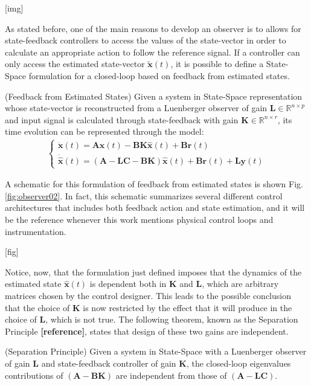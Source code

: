 \documentclass[a4paper,11pt]{book}
\numberwithin{figure}{chapter}
\numberwithin{equation}{chapter}
\numberwithin{table}{chapter}
\newtheorem{theorem}{Theorem}[chapter]
\theoremstyle{definition}
\newtheorem{definition}{Definition}[chapter]
\newcounter{boxed-theorem}
\newenvironment{boxed-theorem}[1]
{\begin{shaded} \begin{theorem}{#1}}
{\end{theorem} \end{shaded}}
\newcounter{boxed-definition}
\newenvironment{boxed-definition}[1]
{\begin{shaded} \begin{definition}{#1}}
{\end{definition} \end{shaded}}
\begin{document}
[img]

As stated before, one of the main reasons to develop an observer is to allows for state-feedback controllers to access the values of the state-vector in order to calculate an appropriate action to follow the reference signal. If a controller can only access the estimated state-vector $\tilde{\bm{x}}(t)$, it is possible to define a State-Space formulation for a closed-loop based on feedback from estimated states.

\begin{boxed-definition}{(Feedback from Estimated States)} \label{def:fdbckLuenberger}
	Given a system in State-Space representation whose state-vector is reconstructed from a Luenberger observer of gain $\bm{L} \in \mathbb{R}^{n \times p}$ and input signal is calculated through state-feedback with gain $\bm{K} \in \mathbb{R}^{n \times r}$, its time evolution can be represented through the model:
	\begin{align} \label{eq:fdbckLuenberger01}
	\begin{cases}
		\dot{\bm{x}}(t) = \bm{A} \bm{x}(t) - \bm{B} \bm{K} \hat{\bm{x}}(t) + \bm{B} \bm{r}(t) \\
		\dot{\hat{\bm{x}}}(t) = \left(\bm{A} - \bm{L} \bm{C} - \bm{B} \bm{K} \right) \hat{\bm{x}}(t) + \bm{B} \bm{r}(t) + \bm{L} \bm{y}(t) 
	\end{cases}
	\end{align}
\end{boxed-definition} 

A schematic for this formulation of feedback from estimated states is shown Fig. \ref{fig:observer02}. In fact, this schematic summarizes several different control architectures that includes both feedback action and state estimation, and it will be the reference whenever this work mentions physical control loops and instrumentation.

[fig]

Notice, now, that the formulation just defined imposes that the dynamics of the estimated state $\hat{\bm{x}}(t)$ is dependent both in $\bm{K}$ and $\bm{L}$, which are arbitrary matrices chosen by the control designer. This leads to the possible conclusion that the choice of $\bm{K}$ is now restricted by the effect that it will produce in the choice of $\bm{L}$, which is not true. The following theorem, known as the Separation Principle \textbf{[reference]}, states that design of these two gains are independent.

\begin{boxed-theorem}{(Separation Principle)} \label{th:separationPrinciple}
	Given a system in State-Space with a Luenberger observer of gain $\bm{L}$ and state-feedback controller of gain $\bm{K}$, the closed-loop eigenvalues contributions of $(\bm{A} - \bm{B}\bm{K})$ are independent from those of $(\bm{A} - \bm{L}\bm{C})$.
\end{boxed-theorem}
\end{document}
